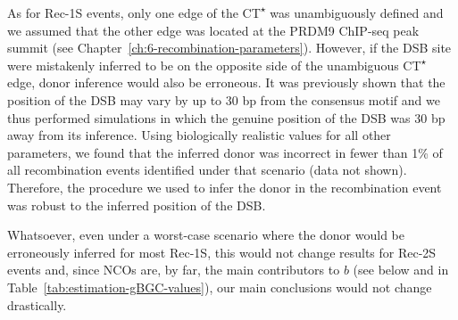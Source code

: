 As for Rec-1S events, only one edge of the CT\textsuperscript{$\star$} was unambiguously defined and we assumed that the other edge was located at the PRDM9 ChIP-seq peak summit (see Chapter~\ref{ch:6-recombination-parameters}).
However, if the DSB site were mistakenly inferred to be on the opposite side of the unambiguous CT\textsuperscript{$\star$} edge, donor inference would also be erroneous.
It was previously shown that the position of the DSB may vary by up to 30 bp from the consensus motif \citep{lange2016landscape} and we thus performed simulations in which the genuine position of the DSB was 30 bp away from its inference. 
Using biologically realistic values for all other parameters, we found that the inferred donor was incorrect in fewer than 1\% of all recombination events identified under that scenario (data not shown). 
Therefore, the procedure we used to infer the donor in the recombination event was robust to the inferred position of the DSB\@.

Whatsoever, even under a worst-case scenario where the donor would be erroneously inferred for most Rec-1S, this would not change results for Rec-2S events and, since NCOs are, by far, the main contributors to $b$ (see below and in Table~\ref{tab:estimation-gBGC-values}), our main conclusions would not change drastically.









